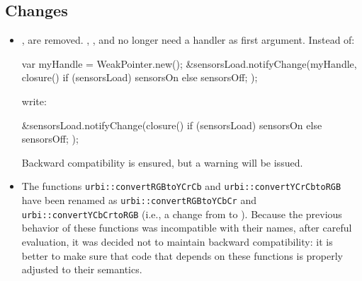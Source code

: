 \subsection{Changes}
\begin{itemize}
\item {},  are removed.
  , , and
   no longer need a handler as first
  argument.  Instead of:
\begin{urbiunchecked}
var myHandle = WeakPointer.new();
&sensorsLoad.notifyChange(myHandle,
  closure() { if (sensorsLoad) sensorsOn else sensorsOff; });
\end{urbiunchecked}
write:
\begin{urbiunchecked}
&sensorsLoad.notifyChange(closure()
   { if (sensorsLoad) sensorsOn else sensorsOff; });
\end{urbiunchecked}
Backward compatibility is ensured, but a warning will be issued.

\item The functions \lstinline{urbi::convertRGBtoYCrCb} and
  \lstinline{urbi::convertYCrCbtoRGB} have been renamed as
  \lstinline{urbi::convertRGBtoYCbCr} and
  \lstinline{urbi::convertYCbCrtoRGB} (i.e., a change from  to
  ).  Because the previous behavior of these functions was
  incompatible with their names, after careful evaluation, it was decided
  not to maintain backward compatibility: it is better to make sure that
  code that depends on these functions is properly adjusted to their
  semantics.
\end{itemize}

